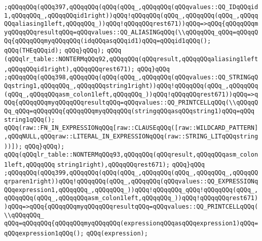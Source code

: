 \verb|;qQQqqQQq(qQQq397,qQQqqQQq(qQQq(qQQq_,qQQqqQQq(qQQqvalues::QQ_IDqQQqid1,qQQqqQQq_,qQQqqQQqid1right))qQQq!qQQqqQQq(qQQq_,qQQqqQQq(qQQq_,qQQqqQQqaliasing1left,qQQqqQQq_))qQQq!qQQqqQQqrest671))qQQq=>qQQq{qQQqqQQqmyqQQqqQQqresultqQQq=qQQqvalues::QQ_ALIASINGqQQq(\\qQQqqQQq_qQQq=qQQqqQQq{qQQqqQQqmyqQQqqQQq(idqQQqasqQQqid1)qQQq=qQQqid1qQQq();|\newline
\verb|qQQq(THEqQQqid);|\newline
\verb|qQQq}qQQq);|\newline
\verb|qQQq|\newline
\verb|(qQQqlr_table::NONTERMqQQq92,qQQqqQQq(qQQqresult,qQQqqQQqaliasing1left,qQQqqQQqid1right),qQQqqQQqrest671);|\newline
\verb|qQQq}qQQq|\newline
\verb|;qQQqqQQq(qQQq398,qQQqqQQq(qQQq(qQQq_,qQQqqQQq(qQQqvalues::QQ_STRINGqQQqstring1,qQQqqQQq_,qQQqqQQqstring1right))qQQq!qQQqqQQq(qQQq_,qQQqqQQq(qQQq_,qQQqqQQqasm_colon1left,qQQqqQQq_))qQQq!qQQqqQQqrest671))qQQq=>qQQq{qQQqqQQqmyqQQqqQQqresultqQQq=qQQqvalues::QQ_PRINTCELLqQQq(\\qQQqqQQq_qQQq=qQQqqQQq{qQQqqQQqmyqQQqqQQq(stringqQQqasqQQqstring1)qQQq=qQQq|\newline
\verb|string1qQQq();|\newline
\verb|qQQq(raw::FN_IN_EXPRESSIONqQQq[raw::CLAUSEqQQq([raw::WILDCARD_PATTERN],qQQqNULL,qQQqraw::LITERAL_IN_EXPRESSIONqQQq(raw::STRING_LITqQQqstring))]);|\newline
\verb|qQQq}qQQq);|\newline
\verb|qQQq(qQQqlr_table::NONTERMqQQq93,qQQqqQQq(qQQqresult,qQQqqQQqasm_colon1left,qQQqqQQq|\newline
\verb|string1right),qQQqqQQqrest671);|\newline
\verb|qQQq}qQQq|\newline
\verb|;qQQqqQQq(qQQq399,qQQqqQQq(qQQq(qQQq_,qQQqqQQq(qQQq_,qQQqqQQq_,qQQqqQQqrparen1right))qQQq!qQQqqQQq(qQQq_,qQQqqQQq(qQQqvalues::QQ_EXPRESSIONqQQqexpression1,qQQqqQQq_,qQQqqQQq_))qQQq!qQQqqQQq_qQQq!qQQqqQQq(qQQq_,qQQqqQQq(qQQq_,qQQqqQQqasm_colon1left,qQQqqQQq_))qQQq!qQQqqQQqrest671))qQQq=>qQQq{qQQqqQQqmyqQQqqQQqresultqQQq=qQQqvalues::QQ_PRINTCELLqQQq(\\qQQqqQQq_|\newline
\verb|qQQq=qQQqqQQq{qQQqqQQqmyqQQqqQQq(expressionqQQqasqQQqexpression1)qQQq=qQQqexpression1qQQq();|\newline
\verb|qQQq(expression);|\newline
